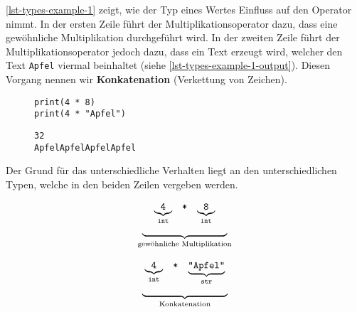 \begin{example}

\autoref{lst-types-example-1} zeigt, wie der Typ eines Wertes Einfluss auf den Operator nimmt. In der ersten Zeile führt der Multiplikationsoperator dazu, dass eine gewöhnliche Multiplikation durchgeführt wird. In der zweiten Zeile führt der Multiplikationsoperator jedoch dazu, dass ein Text erzeugt wird, welcher den Text \lstinline{Apfel} viermal beinhaltet (siehe \autoref{lst-types-example-1-output}). Diesen Vorgang nennen wir \textbf{Konkatenation} (Verkettung von Zeichen).

\begin{figure}[htb]
\begin{minipage}{0.45\textwidth}
\begin{lstlisting}[language=python3, label={lst-types-example-1}, caption={Beide Zeilen verwenden den Multiplikationsoperator.}]
print(4 * 8)
print(4 * "Apfel")
\end{lstlisting}
\end{minipage}
\hfill
\begin{minipage}{0.45\textwidth}
\begin{lstlisting}[language=output, label={lst-types-example-1-output}, caption={Gewöhnliche Multiplikation und Konkatenation des Texts.}]
32
ApfelApfelApfelApfel
\end{lstlisting}
\end{minipage}
\end{figure}

Der Grund für das unterschiedliche Verhalten liegt an den unterschiedlichen Typen, welche in den beiden Zeilen vergeben werden.

\begin{minipage}{0.45\textwidth}
$$
\begin{array}[t]{c}
\begin{array}[t]{ccc}
\underbrace{\texttt{4}}_{\texttt{int}} & \texttt{*} & \underbrace{\texttt{8}}_{\texttt{int}}
\end{array} \\
\underbrace{\hspace{3cm}}_{\textrm{gewöhnliche Multiplikation}}
\end{array}
$$
\end{minipage}
\begin{minipage}{0.45\textwidth}
$$
\begin{array}[t]{c}
\begin{array}[t]{ccc}
\underbrace{\texttt{4}}_{\texttt{int}} & \texttt{*} & \underbrace{\texttt{``Apfel``}}_{\texttt{str}}
\end{array} \\
\underbrace{\hspace{3cm}}_{\textrm{Konkatenation}}
\end{array}
$$
\end{minipage}

\end{example}

